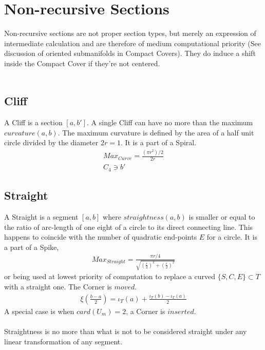 \documentclass{report}
\begin{document}
\section{Non-recursive Sections}
Non-recursive sections are not proper section types, but merely an expression of intermediate calculation and are therefore of medium computational priority (See discussion of oriented submanifolds in Compact Covers). They do induce a shift inside the Compact Cover if they're not centered.\\\\

\subsection{Cliff}
A Cliff is a section $[a,b']$. A single Cliff can have no more than the maximum $curvature(a,b)$. The maximum curvature is defined by the area of a half unit circle divided by the diameter $2r=1$. It is a part of a Spiral.
\begin{align}
Max_{Curve}=\frac{(\pi r^2) /2}{2r}\\
C_{4} \ni b'
\end{align}

\subsection{Straight}
A Straight is a segment $[a,b]$ where $straightness(a,b)$ is smaller or equal to the ratio of arc-length of one eight of a circle to its direct connecting line. This happens to coincide with the number of quadratic end-points $E$ for a circle. It is a part of a Spike,
\begin{align}
Max_{Straight}=\frac{\pi r / 4}{\sqrt{(\frac{r}{2})^2+(\frac{r}{2})^2}}
\end{align}
or being used at lowest priority of computation to replace a curved $\{S,C,E\} \subset T$ with a straight one. The Corner is $moved$.
\begin{align}
\xi(\frac{b-a}{2}) = \iota_{T}(a)+\frac{\iota_{T}(b)-\iota_{T}(a)}{2}
\end{align}
A special case is when $card(U_{m})=2$, a Corner is $inserted$.\\\\
Straightness is no more than what is not to be considered straight under any linear transformation of any segment.
\end{document}
